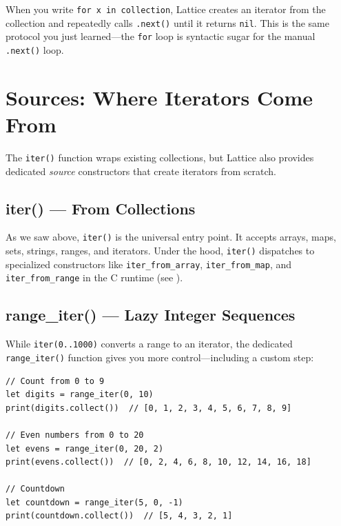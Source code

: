 When you write \lstinline|for x in collection|, Lattice creates an iterator from the collection and repeatedly calls \lstinline|.next()| until it returns \lstinline|nil|.
This is the same protocol you just learned---the \lstinline|for| loop is syntactic sugar for the manual \lstinline|.next()| loop.

\section{Sources: Where Iterators Come From}\label{sec:iterator-sources}

The \lstinline|iter()| function wraps existing collections, but Lattice also provides dedicated \emph{source} constructors that create iterators from scratch.

\subsection{iter() --- From Collections}\label{subsec:iter-from-collection}

As we saw above, \lstinline|iter()| is the universal entry point.
It accepts arrays, maps, sets, strings, ranges, and iterators.
Under the hood, \lstinline|iter()| dispatches to specialized constructors like \lstinline|iter_from_array|, \lstinline|iter_from_map|, and \lstinline|iter_from_range| in the C runtime (see ).

\subsection{range\_iter() --- Lazy Integer Sequences}\label{subsec:range-iter}

While \lstinline|iter(0..1000)| converts a range to an iterator, the dedicated \lstinline|range_iter()| function gives you more control---including a custom step:

\begin{lstlisting}[language=Lattice, caption={Creating range iterators}]
// Count from 0 to 9
let digits = range_iter(0, 10)
print(digits.collect())  // [0, 1, 2, 3, 4, 5, 6, 7, 8, 9]

// Even numbers from 0 to 20
let evens = range_iter(0, 20, 2)
print(evens.collect())  // [0, 2, 4, 6, 8, 10, 12, 14, 16, 18]

// Countdown
let countdown = range_iter(5, 0, -1)
print(countdown.collect())  // [5, 4, 3, 2, 1]
\end{lstlisting}


